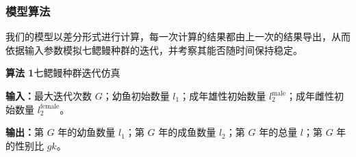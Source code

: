 \documentclass[11pt,a4paper]{ctexart}
\begin{document}
\subsubsection{模型算法}

我们的模型以差分形式进行计算，每一次计算的结果都由上一次的结果导出，从而依据输入参数模拟七鳃鳗种群的迭代，并考察其能否随时间保持稳定。

\vspace{0.5em}
\noindent\textbf{算法 1}\quad 七鳃鳗种群迭代仿真

\noindent\textbf{输入：}最大迭代次数 $G$；幼鱼初始数量 $l_1$；成年雄性初始数量 $l_2^{\mathrm{male}}$；成年雌性初始数量 $l_2^{\mathrm{female}}$。

\noindent\textbf{输出：}第 $G$ 年的幼鱼数量 $l_1$；第 $G$ 年的成鱼数量 $l_2$；第 $G$ 年的总量 $l$；第 $G$ 年的性别比 $gk$。
\end{document}

